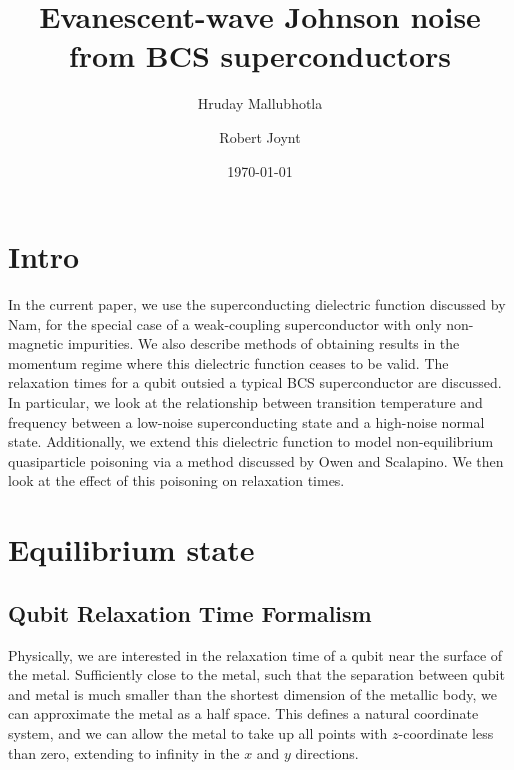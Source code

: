 \documentclass[%
 preprint,
 amsmath,amssymb,
 aps,
]{revtex4-2}
\begin{document}
\title{Evanescent-wave Johnson noise from BCS superconductors}

\author{Hruday Mallubhotla}
\author{Robert Joynt}

\date{\today}


\maketitle

\tableofcontents

\section{Intro} \label{sec:intro}

In the current paper, we use the superconducting dielectric function discussed by Nam\cite{Nam1967}, for the special case of a weak-coupling superconductor with only non-magnetic impurities.
We also describe methods of obtaining results in the momentum regime where this dielectric function ceases to be valid.
The relaxation times for a qubit outsied a typical BCS superconductor are discussed.
In particular, we look at the relationship between transition temperature and frequency between a low-noise superconducting state and a high-noise normal state.
Additionally, we extend this dielectric function to model non-equilibrium quasiparticle poisoning via a method discussed by Owen and Scalapino\cite{OwenScalapino}.
We then look at the effect of this poisoning on relaxation times.

\section{Equilibrium state} \label{sec:equilibrium}
\subsection{Qubit Relaxation Time Formalism} \label{subsec:relaxtime}
Physically, we are interested in the relaxation time of a qubit near the surface of the metal.
Sufficiently close to the metal, such that the separation between qubit and metal is much smaller than the shortest dimension of the metallic body, we can approximate the metal as a half space.
This defines a natural coordinate system, and we can allow the metal to take up all points with $z$-coordinate less than zero, extending to infinity in the $x$ and $y$ directions.
\end{document}
